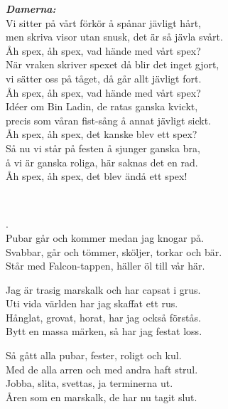 \textbf{\textit{Damerna:}}\\
Vi sitter på vårt förkör å spånar jävligt hårt,\\
men skriva visor utan snusk, det är så jävla svårt.\\
\leftrepeat Åh spex, åh spex, vad hände med vårt spex? \rightrepeat\\
När vraken skriver spexet då blir det inget gjort,\\
vi sätter oss på tåget, då går allt jävligt fort.\\
\leftrepeat Åh spex, åh spex, vad hände med vårt spex? \rightrepeat\\
Idéer om Bin Ladin, de ratas ganska kvickt,\\
precis som våran fist-sång å annat jävligt sickt.\\
\leftrepeat Åh spex, åh spex, det kanske blev ett spex? \rightrepeat\\
Så nu vi står på festen å sjunger ganska bra,\\
å vi är ganska roliga, här saknas det en rad.\\
\leftrepeat Åh spex, åh spex, det blev ändå ett spex! \rightrepeat


\newpage 


 \\       
\author{Text: Martin Johnsson}

.\\
Pubar går och kommer medan jag knogar på.\\
Svabbar, går och tömmer, sköljer, torkar och bär.\\
Står med Falcon-tappen, häller öl till vår här.

Jag är trasig marskalk och har capsat i grus.\\
Uti vida världen har jag skaffat ett rus.\\
Hånglat, grovat, horat, har jag också förstås.\\
Bytt en massa märken, så har jag festat loss.

Så gått alla pubar, fester, roligt och kul.\\
Med de alla arren och med andra haft strul.\\
Jobba, slita, svettas, ja terminerna ut.\\
Åren som en marskalk, de har nu tagit slut.

